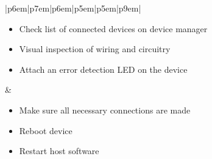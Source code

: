 \documentclass{article}
\begin{document}
\begin{table}[H]
\begin{tabular}{|p{6em}|p{7em}|p{6em}|p{5em}|p{5em}|p{9em}|}
\begin{minipage}[t]{\linewidth}
				\begin{itemize}[nosep, wide=0pt, leftmargin=*, after=\strut]
					\item Check list of connected devices on device manager
					\item Visual inspection of wiring and circuitry
					\item Attach an error detection LED on the device
				\end{itemize}
			\end{minipage}                                                                                  &
			\begin{minipage}[t]{\linewidth}
				\begin{itemize}[nosep, wide=0pt, leftmargin=*, after=\strut]
					\item Make sure all necessary connections are made
					\item Reboot device
					\item Restart host software
				\end{itemize}
			\end{minipage}
			\tabularnewline{}
		\end{tabular}
	\end{table}
	
\end{document}
